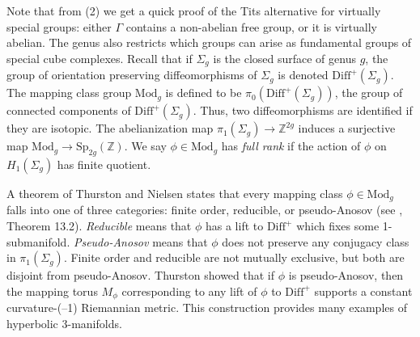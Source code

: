 \documentclass[11pt]{amsart}
\numberwithin{thm}{section}
\theoremstyle{remark}
\theoremstyle{definition}
\newcommand{\Z}{\mathbb{Z}}
\newcommand{\Mod}{\text{Mod}}
\newcommand{\Diff}{\text{Diff}}
\begin{document}
Note that from (2) we get a quick proof of the Tits alternative for virtually special groups: either $\Gamma$ contains a non-abelian free group, or it is virtually abelian.  The genus also restricts which groups can arise as fundamental groups of special cube complexes.  Recall that if $\Sigma_g$ is the closed surface of genus $g$, the group of orientation preserving diffeomorphisms of $\Sigma_g$ is denoted $\Diff^+(\Sigma_g)$.  The mapping class group $\Mod_g$ is defined to be $\pi_0(\Diff^+(\Sigma_g))$, the group of connected components of $\Diff^+(\Sigma_g)$. Thus, two diffeomorphisms are identified if they are isotopic.  The abelianization map $\pi_1(\Sigma_g)\rightarrow \Z^{2g}$ induces a surjective map $\Mod_g\rightarrow \text{Sp}_{2g}(\Z)$. We say $\phi\in \Mod_g$ has \emph{full rank} if the action of $\phi$ on $H_1(\Sigma_g)$ has finite quotient.  


A theorem of Thurston and Nielsen states that every mapping class $\phi\in \Mod_g$ falls into one of three categories: finite order, reducible, or pseudo-Anosov (see \cite{FaMa12}, Theorem 13.2).  \emph{Reducible} means that $\phi$ has a lift to $\Diff^+$ which fixes some 1-submanifold.  \emph{Pseudo-Anosov} means that $\phi$ does not preserve any conjugacy class in $\pi_1(\Sigma_g)$.  Finite order and reducible are not mutually exclusive, but both are disjoint from pseudo-Anosov. Thurston showed that if $\phi$ is pseudo-Anosov, then the mapping torus $M_\phi$ corresponding to any lift of $\phi$ to $\Diff^+$ supports a constant curvature-(--1) Riemannian metric.  This construction provides many examples of hyperbolic 3-manifolds.  
\end{document}

